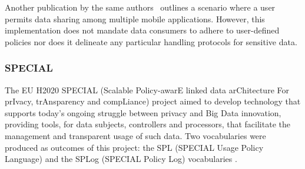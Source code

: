 Another publication by the same authors~\citep{hutchison_framework_2013} outlines a scenario where a user permits data sharing among multiple mobile applications.
However, this implementation does not mandate data consumers to adhere to user-defined policies nor does it delineate any particular handling protocols for sensitive data.


\subsubsection{SPECIAL}
\label{sec:special}

The EU H2020 SPECIAL (Scalable Policy-awarE linked data arChitecture For prIvacy, trAnsparency and compLiance) project aimed to develop technology that supports today's ongoing struggle between privacy and Big Data innovation, providing tools, for data subjects, controllers and processors, that facilitate the management and transparent usage of such data.
Two vocabularies were produced as outcomes of this project: the SPL (SPECIAL Usage Policy Language) and the SPLog (SPECIAL Policy Log) vocabularies \citep{gangemi_scalable_2018}.

